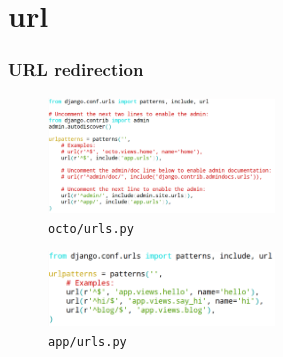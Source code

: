 \documentclass[bigger, presentation]{beamer}
\begin{document}
\section{url}
\label{sec-2}
\begin{frame}
\frametitle{URL redirection}
\label{sec-2-1}



  \begin{figure}[htb]
  \centering
  \includegraphics[width=6cm,angle=0]{./project-urls.png}
  \caption{\label{fig:octo/urls.py}\texttt{octo/urls.py}}
  \end{figure}


  \begin{figure}[htb]
  \centering
  \includegraphics[width=6cm,angle=0]{./apps-urls.png}
  \caption{\label{fig:app/urls.py}\texttt{app/urls.py}}
  \end{figure}
\end{frame}
\end{document}
